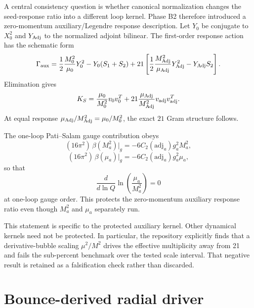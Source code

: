 \documentclass[11pt]{article}
\begin{document}
A central consistency question is whether canonical normalization changes the seed-response ratio into a different loop kernel. Phase B2 therefore introduced a zero-momentum auxiliary/Legendre response description. Let $Y_0$ be conjugate to $X_0^2$ and $Y_{\rm Adj}$ to the normalized adjoint bilinear. The first-order response action has the schematic form
\begin{equation}
\Gamma_{\rm aux}
=\frac12\frac{M_0^2}{\mu_0}Y_0^2-Y_0(S_1+S_2)
+21\left[
\frac12\frac{M_{\rm Adj}^2}{\mu_{\rm Adj}}Y_{\rm Adj}^2-Y_{\rm Adj}S_2
\right].
\end{equation}
Elimination gives
\begin{equation}
K_S=\frac{\mu_0}{M_0^2}v_0v_0^T
+21\frac{\mu_{\rm Adj}}{M_{\rm Adj}^2}v_{\rm adj}v_{\rm adj}^T.
\end{equation}
At equal response $\mu_{\rm Adj}/M_{\rm Adj}^2=\mu_0/M_0^2$, the exact $21$ Gram structure follows.

The one-loop Pati--Salam gauge contribution obeys
\begin{equation}
(16\pi^2)\,\beta(M_a^2)|_g=-6C_2(\mathrm{adj}_a)g_a^2M_a^2,
\end{equation}
\begin{equation}
(16\pi^2)\,\beta(\mu_a)|_g=-6C_2(\mathrm{adj}_a)g_a^2\mu_a,
\end{equation}
so that
\begin{equation}
\frac{d}{d\ln Q}\ln\!\left(\frac{\mu_a}{M_a^2}\right)=0
\end{equation}
at one-loop gauge order. This protects the zero-momentum auxiliary response ratio even though $M_a^2$ and $\mu_a$ separately run.

This statement is specific to the protected auxiliary kernel. Other dynamical kernels need not be protected. In particular, the repository explicitly finds that a derivative-bubble scaling $\mu^2/M^2$ drives the effective multiplicity away from 21 and fails the sub-percent benchmark over the tested scale interval. That negative result is retained as a falsification check rather than discarded.

\section{Bounce-derived radial driver}
\end{document}
